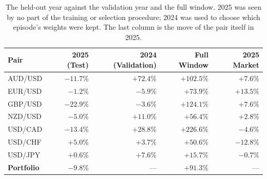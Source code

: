 \begin{table}[htb!]
\centering
\footnotesize
\begin{tabular}{@{}lrrrr@{}}
\toprule
\textbf{Pair} & \textbf{2025 (Test)} & \textbf{2024 (Validation)} & \textbf{Full Window} & \textbf{2025 Market} \\
\midrule
AUD/USD & $-11.7\%$ & $+72.4\%$ & $+102.5\%$ & $+7.6\%$ \\
EUR/USD & $-1.2\%$ & $-5.9\%$ & $+73.9\%$ & $+13.5\%$ \\
GBP/USD & $-22.9\%$ & $-3.6\%$ & $+124.1\%$ & $+7.6\%$ \\
NZD/USD & $-5.0\%$ & $+11.0\%$ & $+56.4\%$ & $+2.8\%$ \\
USD/CAD & $-13.4\%$ & $+28.8\%$ & $+226.6\%$ & $-4.6\%$ \\
USD/CHF & $\mathbf{+5.0\%}$ & $+3.7\%$ & $+50.6\%$ & $-12.8\%$ \\
USD/JPY & $+0.6\%$ & $+7.6\%$ & $+15.7\%$ & $-0.7\%$ \\
\midrule
\textbf{Portfolio} & $\mathbf{-9.8\%}$ & --- & $+91.3\%$ & --- \\
\bottomrule
\end{tabular}
\caption{The held-out year against the validation year and the full window. 2025 was seen by no part of the training or selection procedure; 2024 was used to choose which episode's weights were kept. The last column is the move of the pair itself in 2025.}
\label{Tables:TestYear}
\end{table}